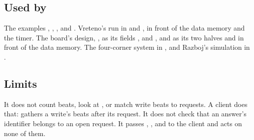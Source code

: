 \subsection*{Used by}

The examples , ,
,  and .
Vreteno's run in  and
, in front of the data memory and the
timer. The board's design, , as its fields ,
 and , and as its two halves  and
 in front of the data memory. The four-corner system in
, and Razboj's simulation in
.

\subsection*{Limits}

It does not count beats, look at , or match write beats to
requests. A client does that:  gathers a write's
beats after its request. It does not check that an answer's identifier
belongs to an open request. It passes , ,
 and  to the client and acts on none of them.
